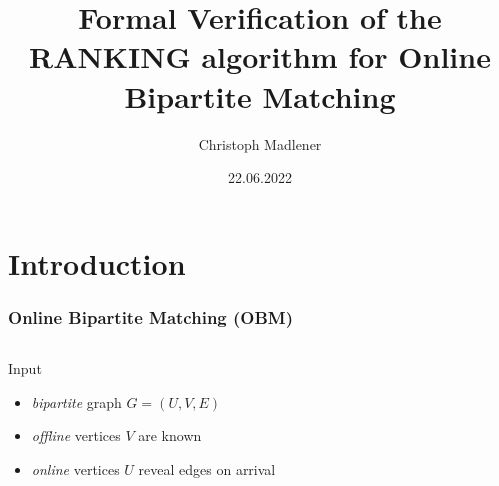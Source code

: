 \documentclass{beamer}
\title{Formal Verification of the RANKING algorithm for Online Bipartite Matching}
\author{Christoph Madlener}
\date{22.06.2022}
\begin{document}
\begin{frame}[plain]
  \titlepage
\end{frame}

\section{Introduction}
\begin{frame}
  \frametitle{Online Bipartite Matching (OBM)}
  \begin{columns}
    \begin{column}{.65\textwidth}
      \begin{exampleblock}{Input}
        \begin{itemize}[<+->]
          \item \emph{bipartite} graph $G = (U,V,E)$
          \item \emph{offline} vertices $V$ are known
          \item \emph{online} vertices $U$ reveal edges on arrival
        \end{itemize}
      \end{exampleblock}
    \end{column}
    \begin{column}{.3\textwidth}
      \vspace{0.5em}
      

\end{column}
\end{columns}
\end{frame}
\end{document}
